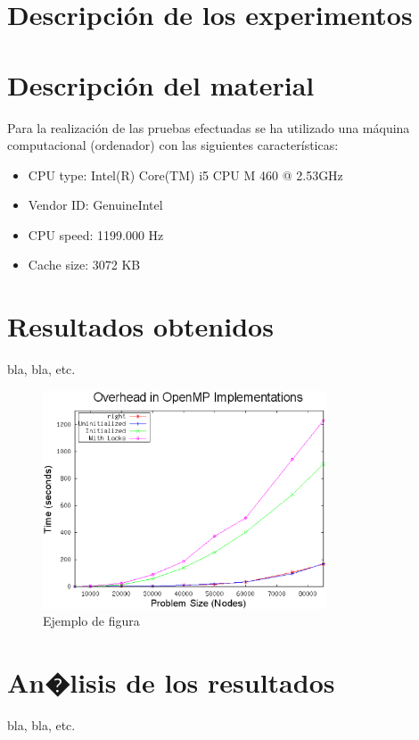 
\section{Descripci\'on de los experimentos}
\label{3:sec:1}


\section{Descripci\'on del material}
\label{3:sec:2}
Para la realizaci\'on de las pruebas efectuadas se ha utilizado una m\'aquina computacional (ordenador) con las siguientes caracter\'isticas:\\
\begin{itemize}
 \item CPU type: Intel(R) Core(TM) i5 CPU M 460  @ 2.53GHz 
 \item Vendor ID: GenuineIntel
 \item CPU speed: 1199.000 Hz
 \item Cache size: 3072 KB
\end{itemize}



\section{Resultados obtenidos}
\label{3:sec:3}

bla, bla, etc. 


\begin{figure}[!th]
\begin{center}
\includegraphics[width=0.75\textwidth]{images/figura1.eps}
\caption{Ejemplo de figura}
\label{fig:1}
\end{center}
\end{figure}




\section{An�lisis de los resultados}
\label{3:sec:4}

bla, bla, etc. 